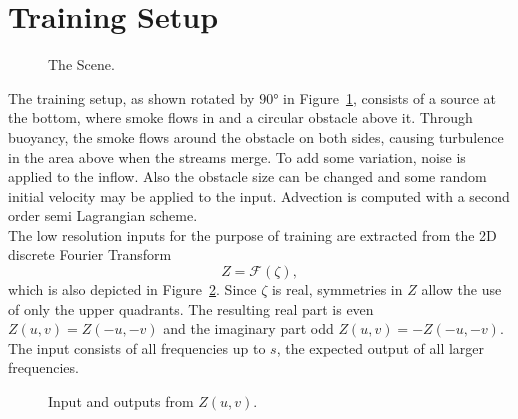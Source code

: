 \documentclass[sigconf]{acmart}
\begin{document}
\section{Training Setup}
\begin{figure}
	\caption{The Scene.}
	\label{trainingScene}
\end{figure}
The training setup, as shown rotated by $\ang{90}$ in Figure~\ref{trainingScene}, consists of a source at the bottom, where smoke flows in and a circular obstacle above it. Through buoyancy, the smoke flows around the obstacle on both sides, causing turbulence in the area above when the streams merge. To add some variation, noise is applied to the inflow. Also the obstacle size can be changed and some random initial velocity may be applied to the input.
Advection is computed with a second order semi Lagrangian scheme.\\
The low resolution inputs for the purpose of training are extracted from the 2D discrete Fourier Transform 
\[
Z = \mathcal{F} (\zeta),
\]
which is also depicted in Figure~\ref{lowFreqs}.
Since $\zeta$ is real, symmetries in $Z$ allow the use of only the upper quadrants. The resulting real part is even $Z(u,v)=Z(-u,-v)$ and the imaginary part odd $Z(u,v)=-Z(-u,-v)$. The input consists of all frequencies up to $s$, the expected output of all larger frequencies.
\begin{figure}
	\caption{Input and outputs from $Z(u,v)$.}
	\label{lowFreqs}
\end{figure}
\end{document}
